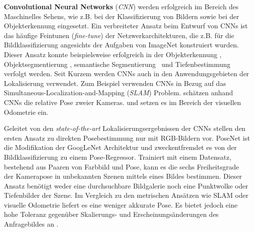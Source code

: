 \textbf{Convolutional Neural Networks} (\textit{CNN}) werden erfolgreich im Bereich des Maschinelles Sehens, wie z.B. bei der Klassifizierung von Bildern \cite{krizhevskyImageNetClassificationDeep2012, simonyanVeryDeepConvolutional2014, heDeepResidualLearning2015} sowie bei der Objekterkennung \cite{girshickRichFeatureHierarchies2013, renFasterRCNNRealTime2015b, girshickFastRCNN2015} eingesetzt. 
Ein verbreiteter Ansatz beim Entwurf von CNNs ist das häufige Feintunen (\textit{fine-tune}) der Netzwerkarchitekturen, die z.B. für die Bildklassifizierung angesichts der Aufgaben von ImageNet \cite{russakovskyImageNetLargeScale2014} konstruiert wurden. Dieser Ansatz konnte beispielsweise erfolgreich in der Objekterkennung \cite{girshickFastRCNN2015}, Objektsegmentierung \cite{kokkinosPushingBoundariesBoundary2015, maninisConvolutionalOrientedBoundaries2016}, semantische Segmentierung \cite{nohLearningDeconvolutionNetwork2015, hazirbasFuseNetIncorporatingDepth2017a} und Tiefenbestimmung \cite{liDepthSurfaceNormal2015} verfolgt werden.
Seit Kurzem werden CNNs auch in den Anwendungsgebieten der Lokalisierung verwendet. Zum Beispiel verwenden  \citet{parisottoGlobalPoseEstimation2018} CNNs in Bezug auf das Simultaneous-Localization-and-Mapping (\textit{SLAM}) Problem. \citet{melekhovRelativeCameraPose2017} schätzen anhand CNNs die relative Pose zweier Kameras. \citet{costanteExploringRepresentationLearning2016} und \citet{wangDeepVOEndtoendVisual2017} setzen es im Bereich der visuellen Odometrie ein.

Geleitet von den \textit{state-of-the-art} Lokalisierungsergebnissen der CNNs stellen \citet{kendallPoseNetConvolutionalNetwork2015} den ersten Ansatz zu direkten Posebestimmung nur mit RGB-Bildern vor. PoseNet ist die Modifikation der GoogLeNet \cite{szegedyGoingDeeperConvolutions2015} Architektur und zweckentfremdet es von der Bildklassifizierung zu einem Pose-Regressor. Trainiert mit einem Datensatz, bestehend aus Paaren von Farbbild und Pose, kann es die sechs Freiheitsgrade der Kamerapose in unbekannten Szenen mittels eines Bildes bestimmen. Dieser Ansatz benötigt weder eine durchsuchbare Bildgalerie noch eine Punktwolke oder Tiefenbilder der Szene. Im Vergleich zu den metrischen Ansätzen wie SLAM oder visuelle Odometrie liefert es eine weniger akkurate Pose. Es bietet jedoch eine hohe Toleranz gegenüber Skalierungs- und Erscheinungsänderungen des Anfragebildes an \cite{piascoSurveyVisualBasedLocalization2018}.

